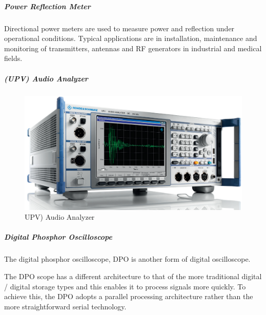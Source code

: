 	
\subparagraph*{Power Reflection Meter}
	
	Directional power meters are used to
measure power and reflection under
operational conditions. Typical applications
are in installation, maintenance and
monitoring of transmitters, antennas and
RF generators in industrial and medical
fields. 

\subparagraph*{(UPV) Audio Analyzer}

\begin{figure}[H]
	\center
	\setlength{\unitlength}{\textwidth} 
	\includegraphics[width=1.0\unitlength]{audany}
	\caption{\label{fig:audany}UPV) Audio Analyzer}
\end{figure}

\subparagraph*{Digital Phosphor Oscilloscope}

	The digital phosphor oscilloscope, DPO is another form of digital oscilloscope.

	The DPO scope has a different architecture to that of the more traditional digital / digital storage types and this enables it to process signals more quickly. To achieve this, the DPO adopts a parallel processing architecture rather than the more straightforward serial technology.




